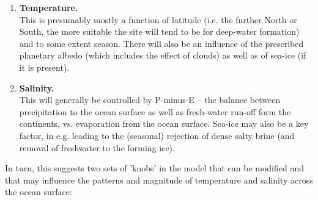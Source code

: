 \vspace{2mm}
\begin{enumerate}
\item \textbf{Temperature.}
\vspace{1mm}
\\This is presumably mostly a function of latitude (i.e. the further North or South, the more suitable the site will tend to be for deep-water formation) and to some extent season. There will also be an influence of the prescribed planetary albedo (which includes the effect of clouds) as well as of sea-ice (if it is present).
\vspace{2mm}
\item \textbf{Salinity.}
\vspace{1mm}
\\This will generally be controlled by P-minus-E -- the balance between precipitation to the ocean surface as well as fresh-water run-off form the continents, vs. evaporation from the ocean surface. Sea-ice may also be a key factor, in e.g. leading to the (seasonal) rejection of dense salty brine (and removal of freshwater to the forming ice).
\end{enumerate}
\vspace{2mm}

In turn, this suggests two sets of 'knobs' in the model that can be modified and that may influence the patterns and magnitude of temperature and salinity across the ocean surface:

